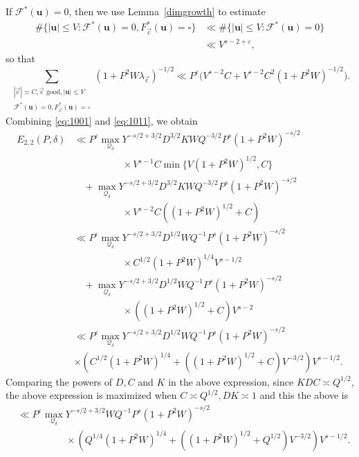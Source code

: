 \documentclass[letterpaper,11pt]{amsart}
\numberwithin{equation}{section}
\theoremstyle{definition}
\numberwithin{equation}{section}
\newcommand{\uu}{\mathbf{u}}
\newcommand{\uc}{{\vec{\mathrm{c}}}}
\def\scrF{{\mathcal F}}
\newcommand{\ve}{\varepsilon}
\begin{document}
If $\mathcal F^*(\uu)=0$, then we use Lemma~\ref{dimgrowth} to estimate
\begin{align*}
\#\{|\uu|\leq V:\scrF^*(\uu)=0, F_\uc^*(\uu)=\square\} 
&\ll \#\{|\uu|\leq V:\scrF^*(\uu)=0\}\\ &\ll  V^{s-2+\ve},
\end{align*}
so that 
\begin{equation}\label{eq:1011}
\sum_{\substack{|\uc|\asymp C, \uc \text{ good}, |\uu|\leq V\\ \scrF^*(\uu)= 0,  F_\uc^*(\uu)=\square }}(1+P^2W\lambda_{\uc})^{-1/2}\ll P^{\ve} \Big(V^{s-2}C+V^{s-2}C^2(1+P^2W)^{-1/2}\Big).
\end{equation}
Combining \eqref{eq:1001} and \eqref{eq:1011}, we obtain
\begin{align} \nonumber
E_{2,2}(P, \delta)
&\ll P^{\ve} \max_{\mathcal Q_\delta}Y^{-s/2+3/2}D^{3/2}KWQ^{-3/2} P^{s}(1+P^2W)^{-s/2}
\\ \nonumber
& \quad \quad \quad\quad \quad \times V^{s-1}C\min\{V(1+P^2W)^{1/2},C\}\\ \nonumber
&\quad  +\max_{\mathcal Q_\delta}Y^{-s/2+3/2}D^{3/2}KWQ^{-3/2} P^{s}(1+P^2W)^{-s/2}
\\ \nonumber
& \quad \quad \quad\quad \quad \times V^{s-2}C((1+P^2W)^{1/2}+C)\\ \nonumber
& \ll P^{\ve}  \max_{\mathcal Q_\delta} Y^{-s/2+3/2}D^{1/2}WQ^{-1} P^{s}(1+P^2W)^{-s/2}
\\ \nonumber
& \quad \quad \quad\quad \quad \times C^{1/2}(1+P^2W)^{1/4}V^{s-1/2}\\ \nonumber
& \quad+ \max_{\mathcal Q_\delta}Y^{-s/2+3/2}D^{1/2}WQ^{-1} P^{s}(1+P^2W)^{-s/2}
\\  \nonumber
& \quad \quad \quad\quad \quad \times((1+P^2W)^{1/2}+C)V^{s-2}\\ \nonumber
 &\ll P^{\ve}\max_{\mathcal Q_\delta}Y^{-s/2+3/2}D^{1/2}WQ^{-1} P^{s}(1+P^2W)^{-s/2}\\
& \times (C^{1/2}(1+P^2W)^{1/4}+((1+P^2W)^{1/2}+C)V^{-3/2})V^{s-1/2}.\label{eq:102}
\end{align}
Comparing the powers of $D,C$ and $K$ in the above expression, since $KDC\asymp Q^{1/2}$, the above expression is maximized when $C\asymp Q^{1/2},DK\asymp 1$ and this the above is
\begin{equation*}
\begin{split}
  &\ll P^{\ve} \max_{\mathcal Q_\delta}Y^{-s/2+3/2}WQ^{-1} P^{s}(1+P^2W)^{-s/2}\\& \quad \quad \quad\quad \quad \times (Q^{1/4}(1+P^2W)^{1/4}+((1+P^2W)^{1/2}+Q^{1/2})V^{-3/2})V^{s-1/2}.%
\end{split}\end{equation*}
\end{document}
